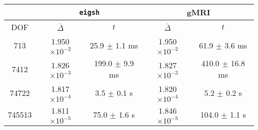 \centering
\renewcommand{\arraystretch}{1.1}
\begin{tabular}{@{}c|cc|cc@{}}
    \toprule
     & \multicolumn{2}{c|}{\texttt{eigsh}} & \multicolumn{2}{c}{\acrshort{gMRI}} \\
    \midrule
    DOF & $\bar{\Delta}$ & $t$ & $\bar{\Delta}$ & $t$ \\
    \midrule
    713 & 1.950 $\times 10^{-2}$ & 25.9 $\pm$ 1.1 ms & 1.950 $\times 10^{-2}$ & 61.9 $\pm$ 3.6 ms \\
    7412 & 1.826 $\times 10^{-3}$ & 199.0 $\pm$ 9.9 ms & 1.827 $\times 10^{-3}$ & 410.0 $\pm$ 16.8 ms \\
    74722 & 1.817 $\times 10^{-4}$ & 3.5 $\pm$ 0.1 s & 1.820 $\times 10^{-4}$ & 5.2 $\pm$ 0.2 s \\
    745513 & 1.811 $\times 10^{-5}$ & 75.0 $\pm$ 1.6 s & 1.846 $\times 10^{-5}$ & 104.0 $\pm$ 1.1 s \\
    \bottomrule
\end{tabular}